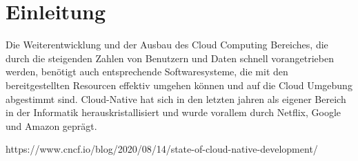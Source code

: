 \chapter{Einleitung}



Die Weiterentwicklung und der Ausbau des Cloud Computing Bereiches, die durch die steigenden Zahlen von Benutzern und Daten schnell vorangetrieben werden, benötigt auch entsprechende Softwaresysteme, die mit den bereitgestellten Resourcen effektiv umgehen können und auf die Cloud Umgebung abgestimmt sind.
Cloud-Native hat sich in den letzten jahren als eigener Bereich in der Informatik herauskristallisiert und wurde vorallem durch Netflix, Google und Amazon geprägt.

https://www.cncf.io/blog/2020/08/14/state-of-cloud-native-development/